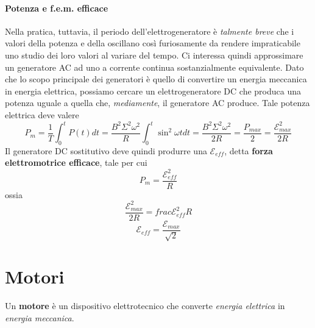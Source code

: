 \paragraph{Potenza e f.e.m. efficace}
Nella pratica, tuttavia, il periodo dell'elettrogeneratore è \textit{talmente breve} che i valori della potenza e della \fem oscillano così furiosamente da rendere impraticabile uno studio dei loro valori al variare del tempo. Ci interessa quindi approssimare un generatore AC ad uno a corrente continua sostanzialmente equivalente. Dato che lo scopo principale dei generatori è quello di convertire un energia meccanica in energia elettrica, possiamo cercare un elettrogeneratore DC che produca una potenza uguale a quella che, \textit{mediamente}, il generatore AC produce. Tale potenza elettrica deve valere
\begin{equation}
	P_m=\frac{1}{T}\int_0^{t}P(t)dt=\frac{B^2\Sigma^2\omega^2}{R}\int_0^{t}\sin^2\omega tdt=\frac{B^2\Sigma^2\omega^2}{2R}=\frac{P_{max}}{2}=\frac{\mathcal{E}_{max}^2}{2R}
\end{equation}
Il generatore DC sostitutivo deve quindi produrre una \fem $\mathcal{E}_{eff}$, detta \textbf{forza elettromotrice efficace}, tale per cui
\begin{equation}
	P_m=\frac{\mathcal{E}^2_{eff}}{R}
\end{equation}
ossia
\begin{equation*}
	\frac{\mathcal{E}_{max}^2}{2R}=frac{\mathcal{E}^2_{eff}}{R}
\end{equation*}
\begin{equation}
	\mathcal{E}_{eff}=\frac{\mathcal{E}_{max}}{\sqrt{2}}
\end{equation}
\section{Motori}
\begin{define}[Motore]
	Un \textbf{motore} è un dispositivo elettrotecnico che converte \textit{energia elettrica} in \textit{energia meccanica}.
\end{define}
